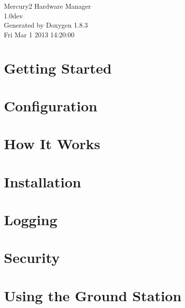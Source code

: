 \documentclass{book}
\begin{document}
\hypersetup{pageanchor=false,citecolor=blue}
\begin{titlepage}
\vspace*{7cm}
\begin{center}
{\Large Mercury2 Hardware Manager \\[1ex]\large 1.\-0dev }\\
\vspace*{1cm}
{\large Generated by Doxygen 1.8.3}\\
\vspace*{0.5cm}
{\small Fri Mar 1 2013 14:20:00}\\
\end{center}
\end{titlepage}
\clearemptydoublepage
{}
\tableofcontents
\clearemptydoublepage
{}
\hypersetup{pageanchor=true,citecolor=blue}
\chapter{Getting Started}
\label{index}\hypertarget{index}{}
\chapter{Configuration}
\label{Configuration}
\hypertarget{Configuration}{}

\chapter{How It Works}
\label{how_it_works}
\hypertarget{how_it_works}{}

\chapter{Installation}
\label{installation}
\hypertarget{installation}{}

\chapter{Logging}
\label{logging}
\hypertarget{logging}{}

\chapter{Security}
\label{security}
\hypertarget{security}{}

\chapter{Using the Ground Station}
\label{using_the_ground_station}
\hypertarget{using_the_ground_station}{}

\end{document}
